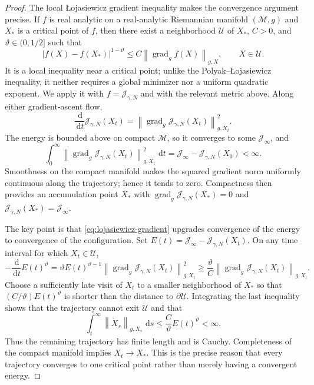 \documentclass[11pt]{amsart}
\numberwithin{equation}{section}
\theoremstyle{plain}
\newcommand{\dd}{\,\mathrm{d}}
\newcommand{\abs}[1]{\left\lvert#1\right\rvert}
\newcommand{\norm}[1]{\left\lVert#1\right\rVert}
\begin{document}
\begin{proof}
The local {\L}ojasiewicz gradient inequality makes the convergence
argument precise.  If $f$ is real analytic on a real-analytic Riemannian
manifold $(\mathcal M,g)$ and $X_*$ is a critical point of $f$, then there
exist a neighborhood $\mathcal U$ of $X_*$, $C>0$, and
$\vartheta\in(0,1/2]$ such that
\begin{equation}\label{eq:lojasiewicz-gradient}
 \abs{f(X)-f(X_*)}^{1-\vartheta}
 \leq C\norm{\operatorname{grad}_g f(X)}_{g,X},
 \qquad X\in\mathcal U.
\end{equation}
It is a local inequality near a critical point; unlike the
Polyak--{\L}ojasiewicz inequality, it neither requires a global minimizer nor
a uniform quadratic exponent.  We apply it with
$f=\mathcal J_{\gamma,N}$ and with the relevant metric above.  Along either
gradient-ascent flow,
\[
 \frac{\dd}{\dd t}\mathcal J_{\gamma,N}(X_t)
 =\norm{\operatorname{grad}_g\mathcal J_{\gamma,N}(X_t)}_{g,X_t}^2.
\]
The energy is bounded above on compact $\mathcal M$, so it converges to some
$\mathcal J_\infty$, and
\[
 \int_0^\infty
 \norm{\operatorname{grad}_g\mathcal J_{\gamma,N}(X_t)}_{g,X_t}^2\,\dd t
 =\mathcal J_\infty-\mathcal J_{\gamma,N}(X_0)<\infty.
\]
Smoothness on the compact manifold makes the squared gradient norm uniformly
continuous along the trajectory; hence it tends to zero.  Compactness then
provides an accumulation point $X_*$ with
$\operatorname{grad}_g\mathcal J_{\gamma,N}(X_*)=0$ and
$\mathcal J_{\gamma,N}(X_*)=\mathcal J_\infty$.

The key point is that \eqref{eq:lojasiewicz-gradient} upgrades convergence of
the energy to convergence of the configuration.  Set
$E(t)=\mathcal J_\infty-\mathcal J_{\gamma,N}(X_t)$.  On any time interval
for which $X_t\in\mathcal U$,
\[
 -\frac{\dd}{\dd t}E(t)^\vartheta
 =\vartheta E(t)^{\vartheta-1}
   \norm{\operatorname{grad}_g\mathcal J_{\gamma,N}(X_t)}_{g,X_t}^2
 \geq \frac{\vartheta}{C}
   \norm{\operatorname{grad}_g\mathcal J_{\gamma,N}(X_t)}_{g,X_t}.
\]
Choose a sufficiently late visit of $X_t$ to a smaller neighborhood of
$X_*$ so that $(C/\vartheta)E(t)^\vartheta$ is shorter than the distance to
$\partial\mathcal U$.  Integrating the last inequality shows that the
trajectory cannot exit $\mathcal U$ and that
\[
 \int_t^\infty\norm{\dot X_s}_{g,X_s}\,\dd s
 \leq \frac{C}{\vartheta}E(t)^\vartheta<\infty.
\]
Thus the remaining trajectory has finite length and is Cauchy.  Completeness
of the compact manifold implies $X_t\to X_*$.  This is the precise reason
that every trajectory converges to one critical point rather than merely
having a convergent energy.


\end{proof}
\end{document}
